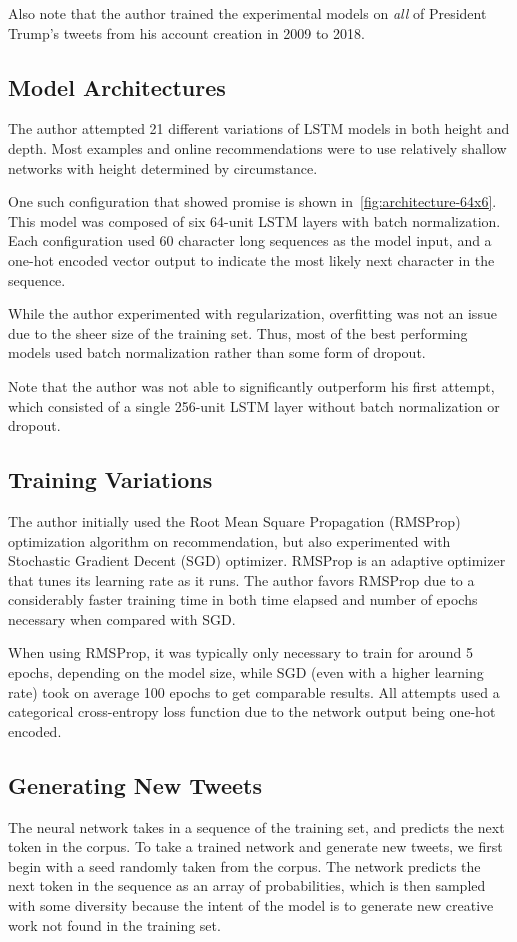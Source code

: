 \documentclass[letterpaper]{article}
\begin{document}
        Also note that the author trained the experimental models on \textit{all} of President Trump's tweets from his account creation in 2009 to 2018.

    \subsection{Model Architectures}
        The author attempted 21 different variations of LSTM models in both height and depth. Most examples and online recommendations were to use relatively shallow networks with height determined by circumstance.

        One such configuration that showed promise is shown in~\autoref{fig:architecture-64x6}. This model was composed of six 64-unit LSTM layers with batch normalization. Each configuration used 60 character long sequences as the model input, and a one-hot encoded vector output to indicate the most likely next character in the sequence.

        While the author experimented with regularization, overfitting was not an issue due to the sheer size of the training set. Thus, most of the best performing models used batch normalization rather than some form of dropout.

        Note that the author was not able to significantly outperform his first attempt, which consisted of a single 256-unit LSTM layer without batch normalization or dropout.

    \subsection{Training Variations}
        The author initially used the Root Mean Square Propagation (RMSProp) optimization algorithm on recommendation, but also experimented with Stochastic Gradient Decent (SGD) optimizer. RMSProp is an adaptive optimizer that tunes its learning rate as it runs. The author favors RMSProp due to a considerably faster training time in both time elapsed and number of epochs necessary when compared with SGD.

        When using RMSProp, it was typically only necessary to train for around 5 epochs, depending on the model size, while SGD (even with a higher learning rate) took on average 100 epochs to get comparable results. All attempts used a categorical cross-entropy loss function due to the network output being one-hot encoded.

    \subsection{Generating New Tweets}
        The neural network takes in a sequence of the training set, and predicts the next token in the corpus. To take a trained network and generate new tweets, we first begin with a seed randomly taken from the corpus. The network predicts the next token in the sequence as an array of probabilities, which is then sampled with some diversity because the intent of the model is to generate new creative work not found in the training set.
\end{document}

